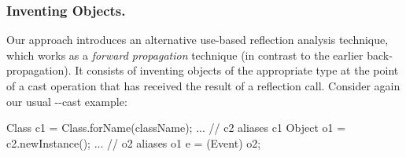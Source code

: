 

%
%

\subsubsection{Inventing Objects.}
\label{sec:invention}

Our approach introduces an alternative use-based reflection analysis
technique, which works as a \emph{forward propagation} technique (in
contrast to the earlier back-propagation). It consists of inventing
objects of the appropriate type at the point of a cast operation that
has received the result of a reflection call. Consider again our
usual --cast example:

\begin{javacodelinum}
Class c1 = Class.forName(className);
...      // c2 aliases c1
Object o1 = c2.newInstance(); 
...      // o2 aliases o1
e = (Event) o2; 
\end{javacodelinum}

